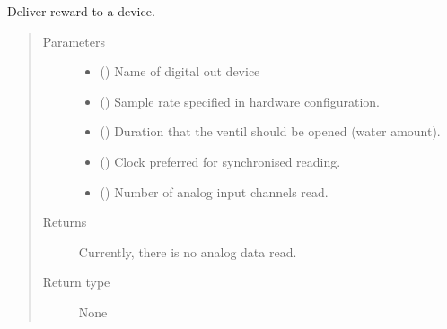 \documentclass[letterpaper,10pt,english]{sphinxmanual}
\begin{document}
\begin{fulllineitems}
\label{\detokenize{NoSeMazeController/HelperFunctions:HelperFunctions.Reward.deliver_reward}}
\pysigstartsignatures
{}
\pysigstopsignatures
\sphinxAtStartPar
Deliver reward to a device.
\begin{quote}\begin{description}
\item[{Parameters}] \leavevmode\begin{itemize}
\item {} 
\sphinxAtStartPar
{} () \textendash{} Name of digital out device

\item {} 
\sphinxAtStartPar
{} () \textendash{} Sample rate specified in hardware configuration.

\item {} 
\sphinxAtStartPar
{} () \textendash{} Duration that the ventil should be opened (water amount).

\item {} 
\sphinxAtStartPar
{} () \textendash{} Clock preferred for synchronised reading.

\item {} 
\sphinxAtStartPar
{} () \textendash{} Number of analog input channels read.

\end{itemize}

\item[{Returns}] \leavevmode
\sphinxAtStartPar
{} \textendash{} Currently, there is no analog data read.

\item[{Return type}] \leavevmode
\sphinxAtStartPar
None

\end{description}\end{quote}

\end{fulllineitems}
\end{document}
